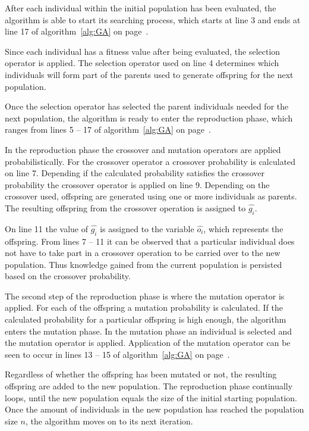 After each individual within the initial population has been evaluated, the algorithm is able to start its searching process, which starts at line 3 and ends at line 17 of algorithm~\ref{alg:GA} on page~\pageref{alg:GA}.

Since each individual has a fitness value after being evaluated, the selection operator is applied. The selection operator used on line 4 determines which individuals will form part of the parents used to generate offspring for the next population.

Once the selection operator has selected the parent individuals needed for the next population, the algorithm is ready to enter the reproduction phase, which ranges from lines 5 -- 17 of algorithm~\ref{alg:GA} on page~\pageref{alg:GA}.

In the reproduction phase the crossover and mutation operators are applied probabilistically. For the crossover operator a crossover probability is calculated on line 7. Depending if the calculated probability satisfies the crossover probability the crossover operator is applied on line 9. Depending on the crossover used, offspring are generated using one or more individuals as parents. The resulting offspring from the crossover operation is assigned to $\hat{g_i}$.

On line 11 the value of $\hat{g_i}$ is assigned to the variable $\hat{o_i}$, which represents the offspring. From lines 7 -- 11 it can be observed that a particular individual does not have to take part in a crossover operation to be carried over to the new population. Thus knowledge gained from the current population is persisted based on the crossover probability.

The second step of the reproduction phase is where the mutation operator is applied. For each of the offspring a mutation probability is calculated. If the calculated probability for a particular offspring is high enough, the algorithm enters the mutation phase. In the mutation phase an individual is selected and the mutation operator is applied. Application of the mutation operator can be seen to occur in lines 13 -- 15 of algorithm~\ref{alg:GA} on page~\pageref{alg:GA}.

Regardless of whether the offspring has been mutated or not, the resulting offspring are added to the new population. The reproduction phase continually loops, until the new population equals the size of the initial starting population. Once the amount of individuals in the new population has reached the population size $n$, the algorithm moves on to its next iteration.


